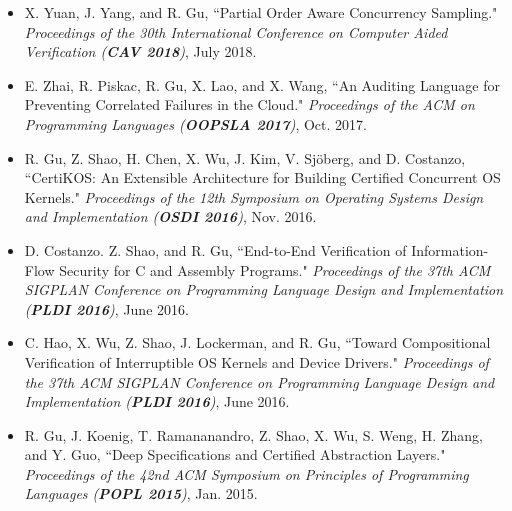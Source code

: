 \documentclass[10pt]{article}
\newenvironment{innerlist}[1][\enskip\textbullet]%
        {\begin{itemize}[#1,leftmargin=25pt,parsep=0pt,itemsep=2pt,topsep=2pt,partopsep=0pt]}
        {\end{itemize}}
\begin{document}
\begin{innerlist}
\vspace{.1in}


\item[] X. Yuan, J. Yang, and R. Gu, ``Partial Order Aware Concurrency Sampling."  \emph{Proceedings of the 30th International Conference on Computer Aided Verification (\textbf{CAV 2018})}, July 2018.

%

\vspace{.1in}

\item[] E. Zhai, R. Piskac, R. Gu, X. Lao, and X. Wang, ``An Auditing Language for Preventing Correlated Failures in the Cloud." \emph{Proceedings of the ACM on Programming Languages (\textbf{OOPSLA 2017})}, Oct. 2017.


\vspace{.1in}


\item[] R. Gu, Z. Shao, H. Chen, X. Wu, J. Kim, V. Sj\"{o}berg, and D. Costanzo, ``CertiKOS: An Extensible Architecture for Building Certified Concurrent OS Kernels." \emph{Proceedings of the 12th Symposium on Operating Systems Design and Implementation (\textbf{OSDI 2016})}, Nov. 2016.

\vspace{.1in}

\item[] D. Costanzo. Z. Shao, and R. Gu, ``End-to-End Verification of Information-Flow Security for C and Assembly Programs." \emph{Proceedings of the 37th ACM SIGPLAN Conference on Programming Language Design and Implementation (\textbf{PLDI 2016})}, June 2016.

\vspace{.1in}


\item[] C. Hao, X. Wu, Z. Shao, J. Lockerman, and R. Gu, ``Toward Compositional Verification of Interruptible OS Kernels and Device Drivers." \emph{Proceedings of the 37th ACM SIGPLAN Conference on Programming Language Design and Implementation (\textbf{PLDI 2016})}, June 2016.

\vspace{.1in}

\item[] R. Gu, J. Koenig, T. Ramananandro, Z. Shao, X. Wu, S. Weng, H. Zhang, and Y. Guo, ``Deep Specifications and Certified Abstraction Layers." \emph{Proceedings of the 42nd ACM Symposium on Principles of Programming Languages (\textbf{POPL 2015})}, Jan. 2015.

\end{innerlist}
\end{document}
